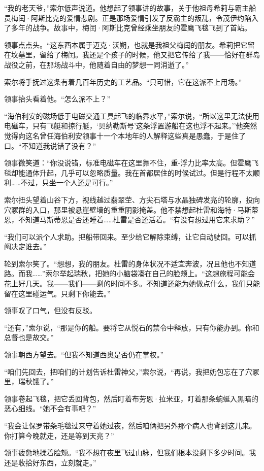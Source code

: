 \documentclass[AutoFakeBold=true]{book}
\begin{document}
``我的老天爷，''索尔低声说道。他想起了领事讲的故事，关于他祖母希莉与霸主船员梅闰·阿斯比克的爱情悲剧。正是那场爱情引发了反霸主的叛乱，令茂伊约陷入了多年的战争。故事中，梅闰·阿斯比克曾经乘坐朋友的霍鹰飞毯飞到了首站。

领事点点头。``这东西本属于迈克·沃朔，也就是我祖父梅闰的朋友。希莉把它留在坟墓里，留给了梅闰。我还是个孩子的时候，他又把它传给了我——恰好在群岛战役之前，在那场战斗中，他随着自由的梦想一同消逝了。''

索尔将手抚过这条有着几百年历史的工艺品。``只可惜，它在这派不上用场。''

领事抬头看着他。``怎么派不上？''

``海伯利安的磁场低于电磁交通工具起飞的临界水平，''索尔说，``所以这里无法使用电磁车，只有飞艇和掠行艇，`贝纳勒斯号'这条浮置游船在这也浮不起来。''他突然觉得向这名曾任海伯利安领事十一个本地年的人解释这些真是愚蠢，于是住了口。``不知道我说错了没有？''

领事微笑道：``你没说错，标准电磁车在这里靠不住，重-浮力比率太高。但霍鹰飞毯却能通体升起，几乎可以忽略质量。我在首都居住的时候试过。但是行程不太顺利……不过，只坐一个人还是可行。''

索尔扭头望着山谷下方，视线越过翡翠茔、方尖石塔与水晶独碑发亮的轮廓，投向穴冢群的入口，那里被悬崖壁墙的重重阴影掩盖。他不禁想起杜雷和海特·马斯蒂恩，不知道马斯蒂恩是否还睡着……杜雷是否还活着。``有没有想过用它来求助？''

``我们可以派个人求助。把船带回来。至少给它解除束缚，让它自动驶回。可以抓阄决定谁去。''

轮到索尔笑了。``想想，我的朋友。杜雷的身体状况不适宜奔波，况且他也不知道路。而我……''索尔举起瑞秋，把她的小脑袋凑在自己的脸颊上。``这趟旅程可能会花上好几天。我——我们——剩的时间不多。不知道还能为她做点什么，我们只能留在这里碰运气。只剩下你能去。''

领事叹了口气，但没有反驳。

``还有，''索尔说，``那是你的船。要将它从悦石的禁令中释放，只有你能办到。你和总督也是故交。''

领事朝西方望去。``但我不知道西奥是否仍在掌权。''

``咱们先回去，把咱们的计划告诉杜雷神父，''索尔说，``再说，我把奶包忘在了穴冢里，瑞秋饿了。''

领事卷起飞毯，把它丢回背包，然后盯着布劳恩·拉米亚，盯着那条蜿蜒入黑暗的恶心细线。``她不会有事吧？''

``我会让保罗带条毛毯过来守着她过夜，然后咱俩把另外那个病人也背到这儿来。你打算今晚就走，还是等到天亮？''

领事疲惫地揉着脸颊。``我不想在夜里飞过山脉，但我们根本没剩下多少时间。我还是收拾好东西，立刻就走。''
\end{document}
